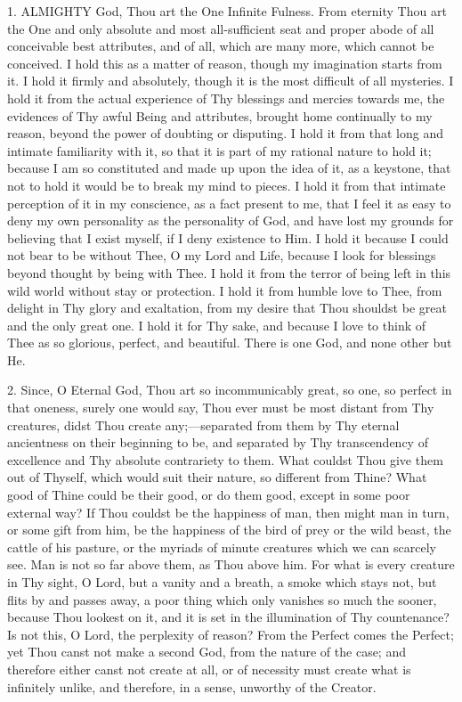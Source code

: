 1. ALMIGHTY
God, Thou art the One Infinite Fulness. From eternity Thou art the One
and only absolute and most all-sufficient seat and proper abode of all
conceivable best attributes, and of all, which are many more, which
cannot be conceived. I hold this as a matter of reason, though my
imagination starts from it. I hold it firmly and absolutely, though it
is the most difficult of all mysteries. I hold it from the actual
experience of Thy blessings and mercies towards me, the evidences of Thy
awful Being and attributes, brought home continually to my reason,
beyond the power of doubting or disputing. I hold it from that long and
intimate familiarity with it, so that it is part of my rational nature
to hold it; because I am so constituted and made up upon the idea of it,
as a keystone, that not to hold it would be to break my mind to pieces.
I hold it from that intimate perception of it in my conscience, as a
fact present to me, that I feel it as easy to deny my own personality as
the personality of God, and have lost my grounds for believing that I
exist myself, if I deny existence to Him. I hold it because I could not
bear to be without Thee, O my Lord and Life, because I look for
blessings beyond thought by being with Thee. I hold it from the
terror of being left in this wild world without stay or protection. I
hold it from humble love to Thee, from delight in Thy glory and
exaltation, from my desire that Thou shouldst be great and the only
great one. I hold it for Thy sake, and because I love to think of Thee
as so glorious, perfect, and beautiful. There is one God, and none other
but He.

2. Since, O Eternal God, Thou
art so incommunicably great, so one, so perfect in that oneness, surely
one would say, Thou ever must be most distant from Thy creatures, didst
Thou create any;—separated from them by Thy eternal ancientness on
their beginning to be, and separated by Thy transcendency of excellence
and Thy absolute contrariety to them. What couldst Thou give them out of
Thyself, which would suit their nature, so different from Thine? What
good of Thine could be their good, or do them good, except in some poor
external way? If Thou couldst be the happiness of man, then might man in
turn, or some gift from him, be the happiness of the bird of prey or the
wild beast, the cattle of his pasture, or the myriads of minute
creatures which we can scarcely see. Man is not so far above them, as
Thou above him. For what is every creature in Thy sight, O Lord, but a
vanity and a breath, a smoke which stays not, but flits by and passes
away, a poor thing which only vanishes so much the sooner, because Thou
lookest on it, and it is set in the illumination of Thy countenance? Is
not this, O Lord, the perplexity of reason? From the Perfect comes the
Perfect; yet Thou canst not make a second God, from the nature of
the case; and therefore either canst not create at all, or of necessity
must create what is infinitely unlike, and therefore, in a sense,
unworthy of the Creator.

